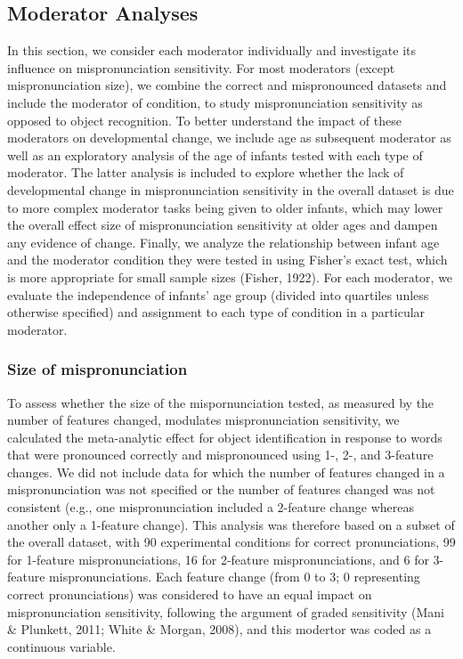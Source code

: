 \documentclass[man]{apa6}
\begin{document}
\hypertarget{moderator-analyses}{%
\subsection{Moderator Analyses}\label{moderator-analyses}}

In this section, we consider each moderator individually and investigate its influence on mispronunciation sensitivity. For most moderators (except mispronunciation size), we combine the correct and mispronounced datasets and include the moderator of condition, to study mispronunciation sensitivity as opposed to object recognition. To better understand the impact of these moderators on developmental change, we include age as subsequent moderator as well as an exploratory analysis of the age of infants tested with each type of moderator. The latter analysis is included to explore whether the lack of developmental change in mispronunciation sensitivity in the overall dataset is due to more complex moderator tasks being given to older infants, which may lower the overall effect size of mispronunciation sensitivity at older ages and dampen any evidence of change. Finally, we analyze the relationship between infant age and the moderator condition they were tested in using Fisher's exact test, which is more appropriate for small sample sizes (Fisher, 1922). For each moderator, we evaluate the independence of infants' age group (divided into quartiles unless otherwise specified) and assignment to each type of condition in a particular moderator.

\hypertarget{size-of-mispronunciation}{%
\subsubsection{Size of mispronunciation}\label{size-of-mispronunciation}}

To assess whether the size of the mispornunciation tested, as measured by the number of features changed, modulates mispronunciation sensitivity, we calculated the meta-analytic effect for object identification in response to words that were pronounced correctly and mispronounced using 1-, 2-, and 3-feature changes. We did not include data for which the number of features changed in a mispronunciation was not specified or the number of features changed was not consistent (e.g., one mispronunciation included a 2-feature change whereas another only a 1-feature change). This analysis was therefore based on a subset of the overall dataset, with 90 experimental conditions for correct pronunciations, 99 for 1-feature mispronunciations, 16 for 2-feature mispronunciations, and 6 for 3-feature mispronunciations. Each feature change (from 0 to 3; 0 representing correct pronunciations) was considered to have an equal impact on mispronunciation sensitivity, following the argument of graded sensitivity (Mani \& Plunkett, 2011; White \& Morgan, 2008), and this modertor was coded as a continuous variable.
\end{document}
